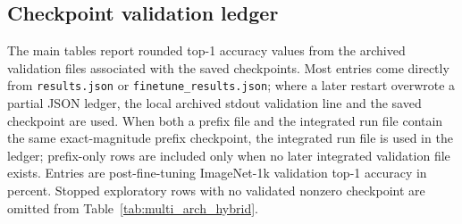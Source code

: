 \documentclass[11pt]{article}
\theoremstyle{plain}
\theoremstyle{definition}
\theoremstyle{remark}
\newcommand{\1}{\mathbf{1}}
\begin{document}
\subsection{Checkpoint validation ledger}
\label{subsec:checkpoint_validation_ledger}

The main tables report rounded top-1 accuracy values from the archived validation files associated with the saved checkpoints.  Most entries come directly from \texttt{results.json} or \texttt{finetune\_results.json}; where a later restart overwrote a partial JSON ledger, the local archived stdout validation line and the saved checkpoint are used.  When both a prefix file and the integrated run file contain the same exact-magnitude prefix checkpoint, the integrated run file is used in the ledger; prefix-only rows are included only when no later integrated validation file exists.  Entries are post-fine-tuning ImageNet-1k validation top-1 accuracy in percent.  Stopped exploratory rows with no validated nonzero checkpoint are omitted from Table~\ref{tab:multi_arch_hybrid}.
\end{document}
